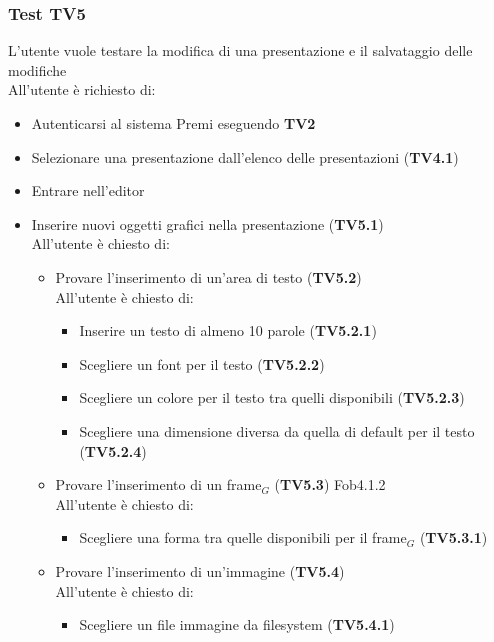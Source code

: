 \subsubsection {Test TV5} %

L'utente vuole testare la modifica di una presentazione e il salvataggio delle modifiche\\
All'utente è richiesto di:

\begin{itemize}
	\item Autenticarsi al sistema Premi eseguendo \textbf{TV2}
	\item Selezionare una presentazione dall'elenco delle presentazioni (\textbf{TV4.1})
	\item Entrare nell'editor
	\item Inserire nuovi oggetti grafici nella presentazione (\textbf{TV5.1})\\
	All'utente è chiesto di:
	\begin{itemize}
		\item Provare l'inserimento di un'area di testo (\textbf{TV5.2})\\
		All'utente è chiesto di:
		\begin{itemize}
			\item Inserire un testo di almeno 10 parole  (\textbf{TV5.2.1})
			\item Scegliere un font per il testo (\textbf{TV5.2.2}) 
			\item Scegliere un colore per il testo tra quelli disponibili (\textbf{TV5.2.3})
			\item Scegliere una dimensione diversa da quella di default per il testo (\textbf{TV5.2.4})
		\end{itemize}
       \item Provare l'inserimento di un frame$_G$  (\textbf{TV5.3}) Fob4.1.2\\
        All'utente è chiesto di:		
        \begin{itemize}
        	\item Scegliere una forma tra quelle disponibili per il frame$_G$  (\textbf{TV5.3.1})
        \end{itemize}
        \item Provare l'inserimento di un'immagine  (\textbf{TV5.4})\\
        All'utente è chiesto di:		
        \begin{itemize}
        	\item Scegliere un file immagine da filesystem (\textbf{TV5.4.1})

\end{itemize}
\end{itemize}
\end{itemize}

